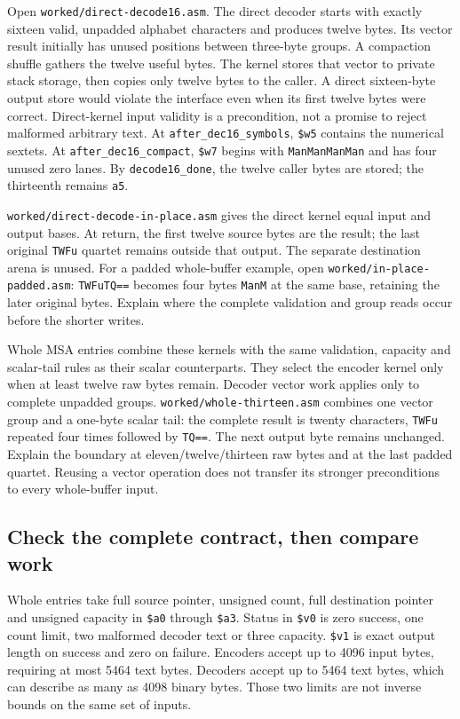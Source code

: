 Open \texttt{worked/direct-decode16.asm}. The direct decoder starts with
exactly sixteen valid, unpadded alphabet
characters and produces twelve bytes. Its vector result initially has unused
positions between three-byte groups. A compaction shuffle gathers the twelve
useful bytes. The kernel stores that vector to private stack storage, then copies
only twelve bytes to the caller. A direct sixteen-byte output store would violate
the interface even when its first twelve bytes were correct. Direct-kernel input
validity is a precondition, not a promise to reject malformed arbitrary text.
At \texttt{after\_dec16\_symbols}, \texttt{\$w5} contains the numerical
sextets. At \texttt{after\_dec16\_compact}, \texttt{\$w7} begins with
\texttt{ManManManMan} and has four unused zero lanes. By \texttt{decode16\_done},
the twelve caller bytes are stored; the thirteenth remains \texttt{a5}.

\texttt{worked/direct-decode-in-place.asm} gives the direct kernel equal
input and output bases. At return, the first twelve source bytes are the result;
the last original \texttt{TWFu} quartet remains outside that output. The
separate destination arena is unused. For a padded whole-buffer example, open
\texttt{worked/in-place-padded.asm}: \texttt{TWFuTQ==} becomes four bytes
\texttt{ManM} at the same base, retaining the later original bytes. Explain
where the complete validation and group reads occur before the shorter writes.

Whole MSA entries combine these kernels with the same validation, capacity and
scalar-tail rules as their scalar counterparts. They select the encoder kernel
only when at least twelve raw bytes remain. Decoder vector work applies only to
complete unpadded groups. \texttt{worked/whole-thirteen.asm} combines one
vector group and a one-byte scalar tail: the complete result is twenty characters,
\texttt{TWFu} repeated four times followed by \texttt{TQ==}. The next output
byte remains unchanged. Explain the boundary at eleven/twelve/thirteen raw
bytes and at the last padded quartet. Reusing a vector operation does not transfer
its stronger preconditions to every whole-buffer input.

\subsection*{Check the complete contract, then compare work}

Whole entries take full source pointer, unsigned count, full destination pointer
and unsigned capacity in \texttt{\$a0} through \texttt{\$a3}. Status in
\texttt{\$v0} is zero success, one count limit, two malformed decoder text or
three capacity. \texttt{\$v1} is exact output length on success and zero on
failure. Encoders accept up to 4096 input bytes, requiring at most 5464 text
bytes. Decoders accept up to 5464 text bytes, which can describe as many as 4098
binary bytes. Those two limits are not inverse bounds on the same set of inputs.


